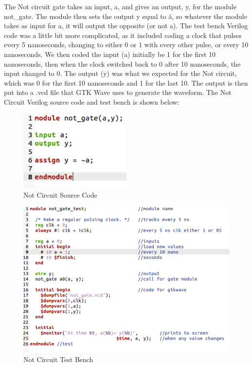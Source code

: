 \documentclass[runningheads, 12pt]{report}
\begin{document}
	The Not circuit gate takes an input, a, and gives an output, y, for the module not\_gate. The module then sets the output y equal to \~a, so whatever the module takes as input for a, it will output the opposite (or not a). The test bench Verilog code was a little bit more complicated, as it included coding a clock that pulses every 5 nanoseconds, changing to either 0 or 1 with every other pulse, or every 10 nanoseconds. We then coded the input (a) initially be 1 for the first 10 nanoseconds, then when the clock switched back to 0 after 10 nanoseconds, the input changed to 0. The output (y) was what we expected for the Not circuit, which was 0 for the first 10 nanoseconds and 1 for the last 10. The output is then put into a .vcd file that GTK Wave uses to generate the waveform. The Not Circuit Verilog source code and test bench is shown below:

\begin{figure}[h]
	\centering
	\includegraphics[width=0.5\textwidth]{not_gate_sc}
	\caption{Not Circuit Source Code}
	\label{fig: not_gate_sc}
\end{figure}

\begin{figure}[h]
	\centering
	\includegraphics[width=1.0\textwidth]{not_gate_test}
	\caption{Not Circuit Test Bench}
	\label{fig: not_gate_test}
\end{figure}
\pagebreak
\end{document}
